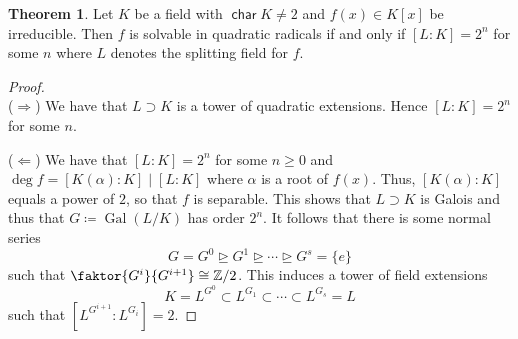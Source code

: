 \documentclass[10pt,letterpaper,cm]{nupset}
\theoremstyle{definition}
\theoremstyle{theorem}
\newtheorem{theorem}[definition]{Theorem}
\theoremstyle{remark}
\newcommand{\Z}{\mathbb Z}
\newcommand{\1}{\mathbf{1}}
\newcommand{\0}{\vec 0}
\DeclareMathOperator{\Char}{\mathsf{char}}
\DeclareMathOperator{\gal}{Gal}
\begin{document}
\begin{theorem}\label{solv}
Let $K$ be a field with $\Char{K} \ne 2$ and $f(x) \in K[x]$ be irreducible. Then $f$ is solvable in quadratic radicals if and only if $[L:K] =2^n$ for some $n$ where $L$ denotes the splitting field for $f$.
\end{theorem}
\begin{proof} $ $
\\
($\Longrightarrow$) We have that $L \supset K$ is a tower of quadratic extensions. Hence  $[L:K] = 2^n$ for some $n$. 

\medskip


($\Longleftarrow$)  We have that $[L:K] = 2^n$ for some $n\geq 0$ and $\deg{f} = [K(\alpha): K] \mid [L: K]$ where $\alpha$ is a root of $f(x)$. Thus, $[K(\alpha): K]$ equals a power of $2$, so that $f$ is separable. This shows that $L \supset K$ is Galois and thus that $G\coloneqq  \gal(L/K)$ has order $2^n$. It follows that there is some normal series $$ G =G^0 \unrhd G^1  \unrhd \cdots \unrhd G^s = \{e\}  $$ such that $\faktor{G^{i}}{G^{i+1}} \cong \Z/2$. This induces a tower of field  extensions $$ K= L^{G^0} \subset L^{G_1} \subset \cdots \subset L^{G_s} = L   $$ such that $[L^{G^{i+1}}: L^{G_i}] =2$.
\end{proof}
\end{document}

